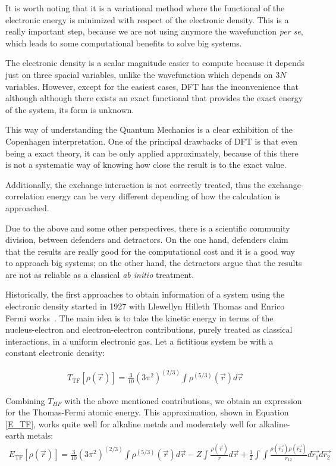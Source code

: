 It is worth noting that it is a variational method where the functional of the
electronic energy is minimized with respect of the electronic density. This is
a really important step, because we are not using anymore the wavefunction
\textit{per se}, which leads to some computational benefits to solve big
systems.

\pagebreak

The electronic density is a scalar magnitude easier to compute because it
depends just on three spacial variables, unlike the wavefunction which depends
on 3$N$ variables. However, except for the easiest cases, DFT has the
inconvenience that although although there exists an exact functional that
provides the exact energy of the system, its form is unknown.

This way of understanding the Quantum Mechanics is a clear exhibition of the
Copenhagen interpretation.  One of the principal drawbacks of DFT is that even
being a exact theory, it can be only applied approximately, because of this
there is not a systematic way of knowing how close the result is to the exact
value. 

Additionally, the exchange interaction is not correctly treated, thus the
exchange-correlation energy can be very different depending of how the
calculation is approached.

Due to the above and some other perspectives, there is a scientific community
division, between defenders and detractors. On the one hand, defenders claim
that the results are really good for the computational cost and it is a good
way to approach big systems; on the other hand, the detractors argue that the
results are not as reliable as a classical \textit{ab initio} treatment.

Historically, the first approaches to obtain information of a system using the
electronic density started in 1927 with Llewellyn Hilleth Thomas and Enrico
Fermi works~\cite{Thomas1927,fermi1927statistical}. The main idea is to take
the kinetic energy in terms of the nucleus-electron and electron-electron
contributions, purely treated as classical interactions, in a uniform
electronic gas. Let a fictitious system be with a constant electronic density:

\begin{align}
  {T}_{\mathrm{TF}}[\rho(\vec{r})]=\displaystyle\frac{3}{10}(3\pi^2)^{(2/3)}\int
  \rho^{(5/3)}(\vec{r})d\vec{r}
\end{align}

Combining $T_{HF}$ with the above mentioned contributions, we obtain an
expression for the Thomas-Fermi atomic energy. This approximation, shown in
Equation \ref{E_TF}, works quite well for alkaline metals and moderately well
for alkaline-earth metals:
%
\begin{align}
  {E}_{\mathrm{TF}}[\rho(\vec{r})]=\displaystyle\frac{3}{10}(3\pi^2)^{(2/3)}\int
  \rho^{(5/3)}(\vec{r})d\vec{r}-Z\int\displaystyle\frac{\rho(\vec{r})}{r}d\vec{r}
  +
  \displaystyle\frac{1}{2}\int\int\displaystyle\frac{\rho(\vec{r_1})\rho(\vec{r_2})}{r_{12}}
  d\vec{r_1}d\vec{r_2}
\label{E_TF}
\end{align}

